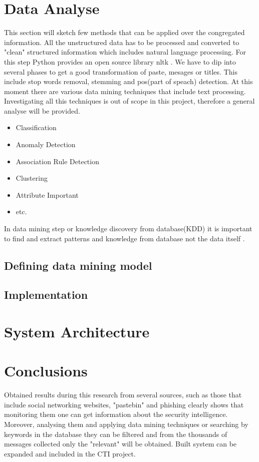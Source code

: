 \documentclass[12pt]{article}
\begin{document}
\section{Data Analyse}
This section will sketch few methods that can be applied over the congregated information. All the unstructured data has to be processed and converted to "clean" structured information which includes natural language processing. For this step Python provides an open source library nltk \cite{nltk}. We have to dip into several phases to get a good transformation of  paste, mesages or titles. This include stop words removal, stemming and pos(part of speach) detection. 
At this moment there are various data mining techniques \cite{oracle-list} that include text processing. Investigating all this techniques is out of scope in this project, therefore a general analyse will be provided. 
\begin{itemize}
\item Classification
\item Anomaly Detection
\item Association Rule Detection
\item Clustering
\item Attribute Important 
\item etc.
\end{itemize}

In data mining step or knowledge discovery from database(KDD) it is important to find and extract patterns and knowledge from database not the data itself \cite{data-kdd}.  
 
\subsection{Defining data mining model}
\subsection{Implementation}

\newpage
\section{System Architecture}
\newpage
\section*{Conclusions}
Obtained results during this research from several sources, such as those that include social networking websites, "pastebin" and phishing clearly shows that monitoring them one can get information about the security intelligence. Moreover, analysing them and applying data mining techniques or searching by keywords in the database they can be filtered and from the thousands of messages collected only the "relevant" will be obtained.  Built system can be expanded and included in the CTI project.
\newpage
\end{document}
